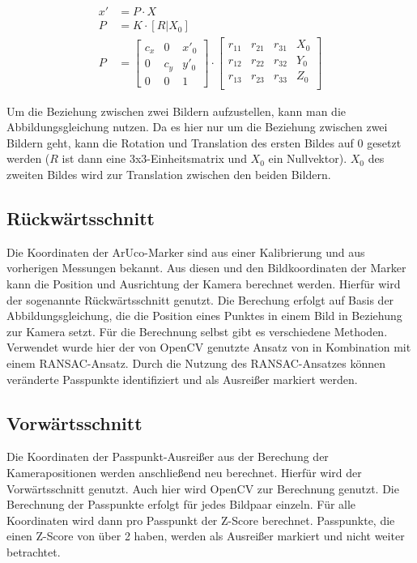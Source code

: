 \documentclass[./00PhotoBox.tex]{subfiles}
\begin{document}
\begin{align}
    \label{abbildungsgleichung}
    x' & = P \cdot X       \\
    P  & = K \cdot [R|X_0] \\
    P  & =
    \begin{bmatrix}
        c_x & 0   & x'_0 \\
        0   & c_y & y'_0 \\
        0   & 0   & 1
    \end{bmatrix}
    \cdot
    \begin{bmatrix}
        r_11 & r_21 & r_31 & X_0 \\
        r_12 & r_22 & r_32 & Y_0 \\
        r_13 & r_23 & r_33 & Z_0 \\
    \end{bmatrix}
\end{align}

Um die Beziehung zwischen zwei Bildern aufzustellen, kann man die Abbildungsgleichung nutzen. Da es hier nur um die Beziehung zwischen zwei Bildern geht, kann die Rotation und Translation des ersten Bildes auf 0 gesetzt werden ($R$ ist dann eine 3x3-Einheitsmatrix und $X_0$ ein Nullvektor). $X_0$ des zweiten Bildes wird zur Translation zwischen den beiden Bildern. \citep[S. 330]{luhmann}


\subsection{Rückwärtsschnitt}
Die Koordinaten der ArUco-Marker sind aus einer Kalibrierung und aus vorherigen Messungen bekannt. Aus diesen und den Bildkoordinaten der Marker kann die Position und Ausrichtung der Kamera berechnet werden. Hierfür wird der sogenannte Rückwärtsschnitt genutzt. Die Berechung erfolgt auf Basis der Abbildungsgleichung, die die Position eines Punktes in einem Bild in Beziehung zur Kamera setzt. Für die Berechnung selbst gibt es verschiedene Methoden. Verwendet wurde hier der von OpenCV genutzte Ansatz von \citeauthor{Lepetit2008} in Kombination mit einem RANSAC-Ansatz. Durch die Nutzung des RANSAC-Ansatzes können veränderte Passpunkte identifiziert und als Ausreißer markiert werden.


\subsection{Vorwärtsschnitt}
Die Koordinaten der Passpunkt-Ausreißer aus der Berechung der Kamerapositionen werden anschließend neu berechnet. Hierfür wird der Vorwärtsschnitt genutzt. Auch hier wird OpenCV zur Berechnung genutzt. Die Berechnung der Passpunkte erfolgt für jedes Bildpaar einzeln. Für alle Koordinaten wird dann pro Passpunkt der Z-Score berechnet. Passpunkte, die einen Z-Score von über 2 haben, werden als Ausreißer markiert und nicht weiter betrachtet.
\end{document}
